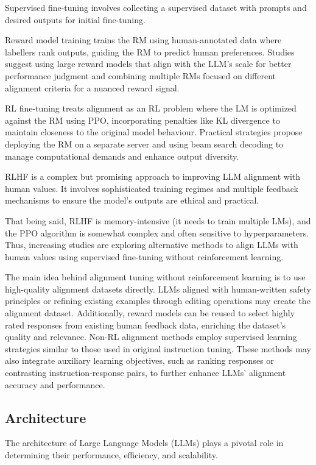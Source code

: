 Supervised fine-tuning involves collecting a supervised dataset with prompts and desired outputs for initial fine-tuning.

Reward model training trains the RM using human-annotated data where labellers rank outputs, guiding the RM to predict human preferences.
Studies suggest using large reward models that align with the LLM's scale for better performance judgment and combining multiple RMs focused on different alignment criteria for a nuanced reward signal.

RL fine-tuning treats alignment as an RL problem where the LM is optimized against the RM using PPO, incorporating penalties like KL divergence to maintain closeness to the original model behaviour.
Practical strategies propose deploying the RM on a separate server and using beam search decoding to manage computational demands and enhance output diversity.

RLHF is a complex but promising approach to improving LLM alignment with human values. It involves sophisticated training regimes and multiple feedback mechanisms to ensure the model's outputs are ethical and practical.

That being said, RLHF is memory-intensive (it needs to train multiple LMs), and the PPO algorithm is somewhat complex and often sensitive to hyperparameters.
Thus, increasing studies are exploring alternative methods to align LLMs with human values using supervised fine-tuning without reinforcement learning.

The main idea behind alignment tuning without reinforcement learning is to use high-quality alignment datasets directly.
LLMs aligned with human-written safety principles or refining existing examples through editing operations may create the alignment dataset.
Additionally, reward models can be reused to select highly rated responses from existing human feedback data, enriching the dataset's quality and relevance.
Non-RL alignment methods employ supervised learning strategies similar to those used in original instruction tuning.
These methods may also integrate auxiliary learning objectives, such as ranking responses or contrasting instruction-response pairs, to further enhance LLMs' alignment accuracy and performance.

\subsection{Architecture}
\label{sec:architecture}

The architecture of Large Language Models (LLMs) plays a pivotal role in determining their performance, efficiency, and scalability.

